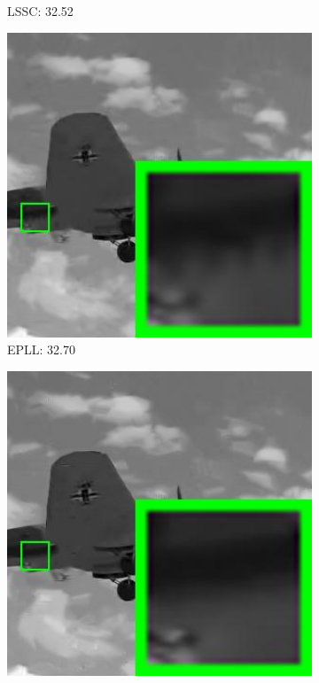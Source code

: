 \begin{figure}
\begin{subfigure}[t]{0.24\textwidth}
		\caption{LSSC: 32.52}
    \end{subfigure}
    \hfill
    \begin{subfigure}[t]{0.24\textwidth}
        \centering
        \includegraphics[width=1\textwidth]{images/pgpd/200img/br_NCSR_30_3063.jpg}
		\caption{EPLL: 32.70}
    \end{subfigure}
    \hfill
    \begin{subfigure}[t]{0.24\textwidth}
        \centering
        \includegraphics[width=1\textwidth]{images/pgpd/200img/br_WNNM_30_3063.jpg}

\end{subfigure}
\end{figure}
